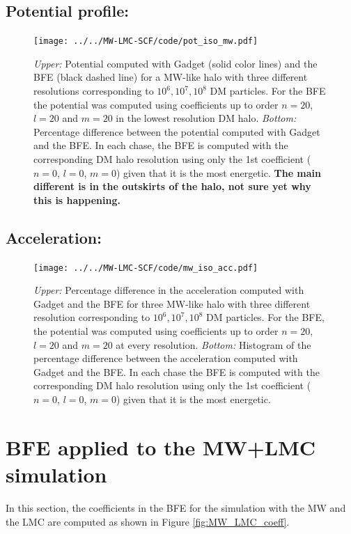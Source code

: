 \documentclass[14pt]{article}
\begin{document}
\subsection{Potential profile:}


\begin{figure}[H]
  \centering
  \texttt{[image: ../../MW-LMC-SCF/code/pot\_iso\_mw.pdf]}
  \caption{\textit{Upper:} Potential computed with Gadget (solid color lines)
  and the BFE (black dashed line) for a MW-like halo with three different
  resolutions corresponding to $10^6, 10^7, 10^8$ DM particles. For the BFE the
  potential was computed using coefficients up to order
  $n=20$, $l=20$ and $m=20$ in the lowest resolution DM halo. \textit{Bottom:}
  Percentage difference between the potential computed with Gadget and the BFE.
  In each chase, the BFE is computed with the corresponding DM halo resolution
  using only the 1st coefficient ($n=0$, $l=0$, $m=0$) given that it is
  the most energetic. \textbf{The main different is in the outskirts of the
  halo, not sure yet why this is happening.}}
\end{figure}


\subsection{Acceleration:}


\begin{figure}[H]
  \centering
  \texttt{[image: ../../MW-LMC-SCF/code/mw\_iso\_acc.pdf]}
  \caption{\textit{Upper:} Percentage difference in the acceleration computed with Gadget 
  and the BFE for three MW-like halo with three different
  resolution corresponding to $10^6, 10^7, 10^8$ DM particles. For the BFE, the
  potential was computed using coefficients up to order
  $n=20$, $l=20$ and $m=20$ at every resolution.
  \textit{Bottom:}
  Histogram of the percentage difference between the acceleration computed with Gadget and the BFE.
  In each chase the BFE is computed with the corresponding DM halo resolution
  using only the 1st coefficient ($n=0$, $l=0$, $m=0$) given that it is
  the most energetic.}
\end{figure}



\section{BFE applied to the MW+LMC simulation}

In this section, the coefficients in the BFE for the simulation with the MW and
the LMC are computed as shown in Figure \ref{fig:MW_LMC_coeff}.
\end{document}
